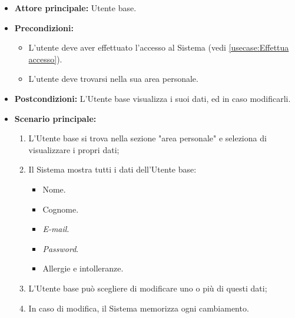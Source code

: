 \label{usecase:Visualizza e modifica dati utente}
\begin{itemize}
	\item \textbf{Attore principale:} Utente base.

	\item \textbf{Precondizioni:}
	\begin{itemize}
        \item L'utente deve aver effettuato l'accesso al Sistema (vedi \autoref{usecase:Effettua accesso}).
        \item L'utente deve trovarsi nella sua area personale.
    \end{itemize}

	\item \textbf{Postcondizioni:} L'Utente base visualizza i suoi dati, ed in caso modificarli.

	\item \textbf{Scenario principale:}
	      \begin{enumerate}
		      \item L'Utente base si trova nella sezione "area personale" e seleziona di visualizzare i propri dati;
		      \item Il Sistema mostra tutti i dati dell'Utente base:
              \begin{itemize}
                \item Nome.
                \item Cognome.
                \item \textit{E-mail}.
                \item \textit{Password}.
                \item Allergie e intolleranze.
              \end{itemize}
              \item L'Utente base può scegliere di modificare uno o più di questi dati;
              \item In caso di modifica, il Sistema memorizza ogni cambiamento.
	      \end{enumerate}
\end{itemize}
